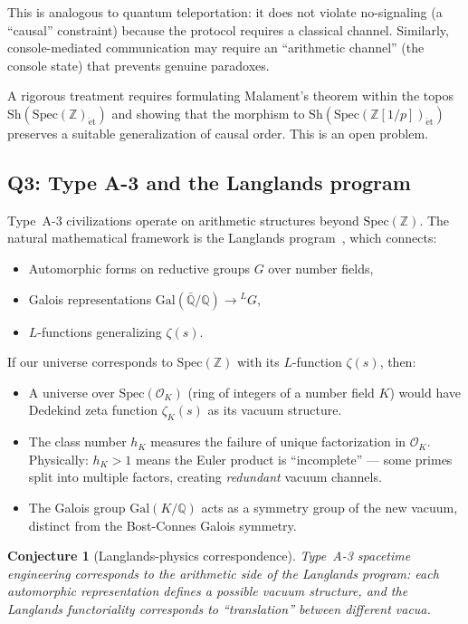 \documentclass[11pt,a4paper]{article}
\newtheorem{conjecture}[theorem]{Conjecture}
\newcommand{\Spec}{\mathrm{Spec}}
\newcommand{\Zp}{\mathbb{Z}[1/p]}
\newcommand{\Sh}{\mathrm{Sh}}
\begin{document}
This is analogous to quantum teleportation: it does not violate
no-signaling (a ``causal'' constraint) because the protocol
requires a classical channel. Similarly, console-mediated
communication may require an ``arithmetic channel'' (the console
state) that prevents genuine paradoxes.

A rigorous treatment requires formulating Malament's theorem
within the topos $\Sh(\Spec(\mathbb{Z})_{\mathrm{\acute{e}t}})$
and showing that the morphism to $\Sh(\Spec(\Zp)_{\mathrm{\acute{e}t}})$
preserves a suitable generalization of causal order. This is an
open problem.

\subsection{Q3: Type A-3 and the Langlands program}

Type~A-3 civilizations operate on arithmetic structures beyond
$\Spec(\mathbb{Z})$. The natural mathematical framework is
the Langlands program~\cite{Langlands1970,Frenkel2007}, which
connects:
\begin{itemize}
\item Automorphic forms on reductive groups $G$ over number fields,
\item Galois representations $\mathrm{Gal}(\bar{\mathbb{Q}}/\mathbb{Q}) \to {}^LG$,
\item $L$-functions generalizing $\zeta(s)$.
\end{itemize}

If our universe corresponds to $\Spec(\mathbb{Z})$ with its
$L$-function $\zeta(s)$, then:
\begin{itemize}
\item A universe over $\Spec(\mathcal{O}_K)$ (ring of integers
  of a number field $K$) would have Dedekind zeta function
  $\zeta_K(s)$ as its vacuum structure.
\item The class number $h_K$ measures the failure of unique
  factorization in $\mathcal{O}_K$. Physically: $h_K > 1$
  means the Euler product is ``incomplete'' --- some primes
  split into multiple factors, creating \emph{redundant}
  vacuum channels.
\item The Galois group $\mathrm{Gal}(K/\mathbb{Q})$ acts as
  a symmetry group of the new vacuum, distinct from the
  Bost-Connes Galois symmetry.
\end{itemize}

\begin{conjecture}[Langlands-physics correspondence]
Type~A-3 spacetime engineering corresponds to the arithmetic
side of the Langlands program: each automorphic representation
defines a possible vacuum structure, and the Langlands functoriality
corresponds to ``translation'' between different vacua.
\end{conjecture}
\end{document}
